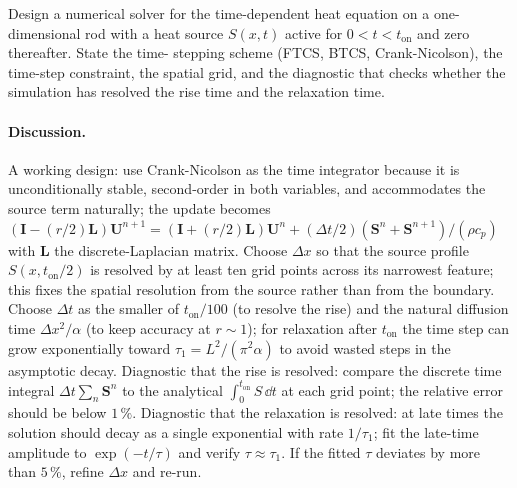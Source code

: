 \begin{exercise}
Design a numerical solver for the time-dependent heat equation
on a one-dimensional rod with a heat source $S(x, t)$ active for
$0 < t < t_{\text{on}}$ and zero thereafter. State the time-
stepping scheme (FTCS, BTCS, Crank-Nicolson), the time-step
constraint, the spatial grid, and the diagnostic that checks
whether the simulation has resolved the rise time and the
relaxation time.

\paragraph{Discussion.}
A working design: use Crank-Nicolson as the time integrator
because it is unconditionally stable, second-order in both
variables, and accommodates the source term naturally; the update
becomes
$(\mathbf{I} - (r/2)\mathbf{L}) \mathbf{U}^{n+1} = (\mathbf{I} +
(r/2)\mathbf{L}) \mathbf{U}^{n} + (\Delta t/2)(\mathbf{S}^{n} +
\mathbf{S}^{n+1})/(\rho c_{p})$ with $\mathbf{L}$ the
discrete-Laplacian matrix. Choose $\Delta x$ so that the source
profile $S(x, t_{\text{on}}/2)$ is resolved by at least ten grid
points across its narrowest feature; this fixes the spatial
resolution from the source rather than from the boundary. Choose
$\Delta t$ as the smaller of $t_{\text{on}}/100$ (to resolve the
rise) and the natural diffusion time $\Delta x^{2}/\alpha$ (to
keep accuracy at $r \sim 1$); for relaxation after $t_{\text{on}}$
the time step can grow exponentially toward $\tau_{1} =
L^{2}/(\pi^{2}\alpha)$ to avoid wasted steps in the asymptotic
decay. Diagnostic that the rise is resolved: compare the
discrete time integral $\Delta t \sum_{n} \mathbf{S}^{n}$ to the
analytical $\int_{0}^{t_{\text{on}}} S\,\dd t$ at each grid
point; the relative error should be below $1\,\%$. Diagnostic
that the relaxation is resolved: at late times the solution
should decay as a single exponential with rate $1/\tau_{1}$;
fit the late-time amplitude to $\exp(-t/\tau)$ and verify $\tau
\approx \tau_{1}$. If the fitted $\tau$ deviates by more than
$5\,\%$, refine $\Delta x$ and re-run.
\end{exercise}

